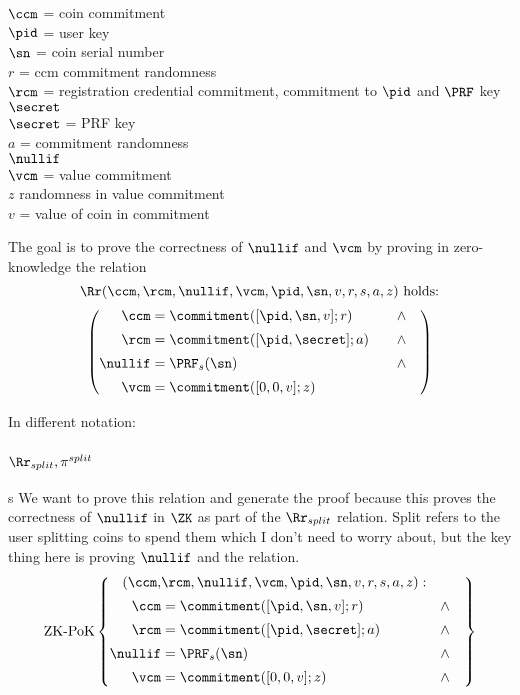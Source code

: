 \newpage

$\ccm$ = coin commitment \\
$\pid$ = user key \\
$\sn$ = coin serial number \\
$r$ = ccm commitment randomness \\
$\rcm$ = registration credential commitment, commitment to $\pid$ and $\PRF$ key $\secret$ \\
$\secret$ = PRF key \\
$a$ = commitment randomness \\
$\nullif$ \\
$\vcm$ = value commitment \\
$z$ randomness in value commitment\\
$v$ = value of coin in commitment

\noindent The goal is to prove the correctness of $\nullif$ and $\vcm$ by proving in zero-knowledge the relation 
\[ \Rr(\ccm, \rcm, \nullif, \vcm, \pid, \sn, v, r, s, a, z ) \text{ holds:}\] 
\begin{equation}
\left(
    \begin{aligned}
        \ccm &= \commitment([ \pid, \sn, v]; r) \quad & \wedge \quad \\[2pt]
        \rcm &= \commitment([ \pid, \secret]; a) \quad & \wedge \quad \\[2pt]
        \nullif &= \PRF_s(\sn) \qquad & \wedge \quad \\[2pt]
        \vcm &= \commitment([0,0,v]; z)
    \end{aligned}
\right)
\end{equation}

In different notation:

\subsubsection{$\Rr_{split}, \pi^{split}$}s
We want to prove this relation and generate the proof because this proves the correctness of $\nullif$ in $\ZK$ as part of the $\Rr_{split}$ relation.
Split refers to the user splitting coins to spend them which I don't need to worry about, but the key thing here is proving $\nullif$ and the relation.
\begin{equation*}
 \text{ZK-PoK}\left\{
    \begin{aligned}
        (\ccm, & \rcm, \nullif, \vcm, \pid, \sn, v, r, s, a, z ) : \\[2pt]
        \ccm &= \commitment([ \pid, \sn, v]; r) \quad & \wedge \quad \\[2pt]
        \rcm &= \commitment([ \pid, \secret]; a) \quad & \wedge \quad \\[2pt]
        \nullif &= \PRF_s(\sn) \qquad & \wedge \quad \\[2pt]
        \vcm &= \commitment([0,0,v]; z) \qquad & \wedge \quad \\[2pt]
    \end{aligned}
\right\}
\end{equation*}

